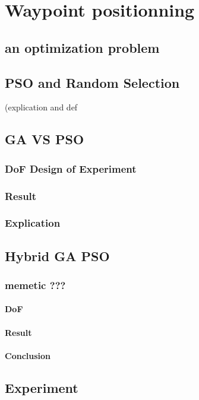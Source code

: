 \chapter{Waypoint positionning} 


\minitoc


\section{an optimization problem }

\section{PSO and Random Selection }(explication and def 

\section{GA VS PSO }\label{sec:GAvsPSO}
	\subsection{DoF Design of Experiment}
	\subsection{Result}
	\subsection{Explication}

\section{Hybrid GA PSO}
	\subsection{memetic ???}
		\subsubsection{DoF}
		\subsubsection{Result}
		\subsubsection{Conclusion}
		
\section{Experiment}
